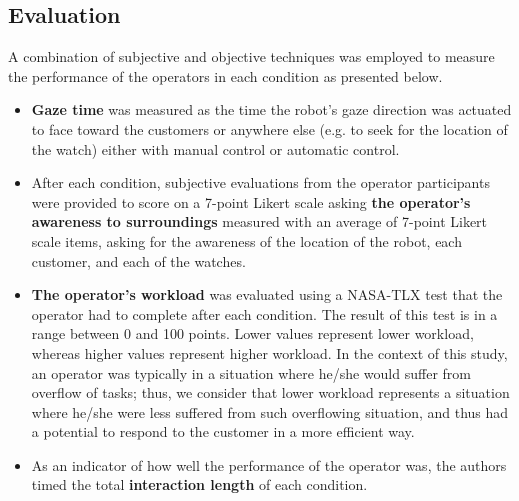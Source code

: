 \documentclass[journal]{IEEEtran}
\begin{document}
\subsection{Evaluation}
A combination of subjective and objective techniques was employed to measure the performance of the operators in each condition as presented below.
\begin{itemize}
  \item {\bf Gaze time} was measured as the time the robot's gaze direction was actuated to face toward the customers or anywhere else (e.g. to seek for the location of the watch) either with manual control or automatic control.
  \item After each condition, subjective evaluations from the operator participants were provided to score on a 7-point Likert scale asking {\bf the operator's awareness to surroundings} measured with an average of 7-point Likert scale items, asking for the awareness of the location of the robot, each customer, and each of the watches.
  \item {\bf The operator's workload} was evaluated using a NASA-TLX test\cite{hart:tlx} that the operator had to complete after each condition. The result of this test is in a range between 0 and 100 points. Lower values represent lower workload, whereas higher values represent higher workload. 
  In the context of this study, an operator was typically in a situation where he/she would suffer from overflow of tasks; thus, we consider that lower workload represents a situation where he/she were less suffered from such overflowing situation, and thus had a potential to respond to the customer in a more efficient way.
  \item As an indicator of how well the performance of the operator was, the authors timed the total {\bf interaction length} of each condition. 

\end{itemize}
\end{document}
